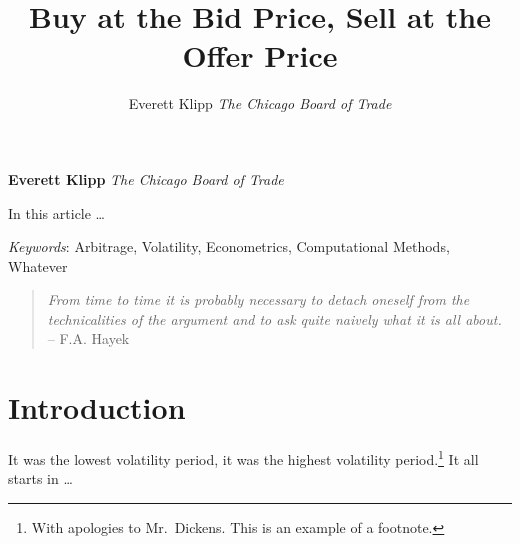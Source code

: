 \documentclass[11pt,]{article}
\title{Buy at the Bid Price, Sell at the Offer Price  }
\author{\Large Everett Klipp\vspace{0.05in} \newline\normalsize\emph{The Chicago Board of Trade}  }
\date{}
\newcommand*{\authorfont}{\fontfamily{phv}\selectfont}
\renewenvironment{abstract}
 {{%
    \setlength{\leftmargin}{0mm}
    \setlength{\rightmargin}{\leftmargin}%
  }%
  \relax}
 {\endlist}
\begin{document}
	
%

{%
\setlength{\parindent}{0pt}
\thispagestyle{plain}
{\fontsize{18}{20}\selectfont\raggedright 
\maketitle  %

}

{
   \vskip 13.5pt\relax \normalsize\fontsize{11}{12} 
\textbf{\authorfont Everett Klipp} \hskip 15pt \emph{\small The Chicago Board of Trade}   

}

}







\begin{abstract}

    \hbox{\vrule height .2pt width 39.14pc}

    \vskip 8.5pt %

\noindent In this article \ldots{}


\vskip 8.5pt \noindent \emph{Keywords}: Arbitrage, Volatility, Econometrics, Computational Methods, Whatever \par

    \hbox{\vrule height .2pt width 39.14pc}



\end{abstract}


\vskip 6.5pt

\noindent \doublespacing \begin{quote}
\emph{From time to time it is probably necessary to detach oneself from
the technicalities of the argument and to ask quite naively what it is
all about.} -- F.A. Hayek
\end{quote}

\section{Introduction}\label{introduction}

It was the lowest volatility period, it was the highest volatility
period.\footnote{With apologies to Mr.~Dickens. This is an example of a
  footnote.} It all starts in \citet{Buchanan1964} \ldots{}

\newpage
\singlespacing 

\end{document}
